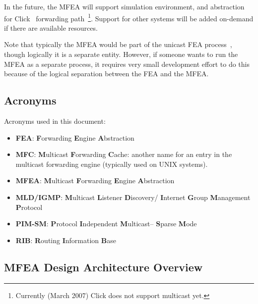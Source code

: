 \documentclass[11pt]{article}
\begin{document}
In the future, the MFEA will support simulation environment, and
abstraction for Click~\cite{CLICK-PROJECT} forwarding
path~\footnote{Currently (March 2007) Click does
not support multicast yet.}. Support for other systems will be added
on-demand if there are available resources.

Note that typically the MFEA would be part of the unicast FEA
process~\cite{xorp:fea}, though logically it is a separate entity.
However, if someone wants to run the MFEA as a separate process, it
requires very small development effort to do this because of the logical
separation between the FEA and the MFEA.

\subsection{Acronyms}

Acronyms used in this document:

\begin{itemize}

  \item {\bf FEA}: {\bf F}orwarding {\bf E}ngine {\bf A}bstraction

  \item {\bf MFC}: {\bf M}ulticast {\bf F}orwarding {\bf C}ache: another
  name for an entry in the multicast forwarding engine (typically used
  on UNIX systems).

  \item {\bf MFEA}: {\bf M}ulticast {\bf F}orwarding {\bf E}ngine
  {\bf A}bstraction

  \item {\bf MLD/IGMP}: {\bf M}ulticast {\bf L}istener {\bf D}iscovery/{\bf
  I}nternet {\bf G}roup {\bf M}anagement {\bf P}rotocol

  \item {\bf PIM-SM}: {\bf P}rotocol {\bf I}ndependent {\bf M}ulticast--{\bf
  S}parse {\bf M}ode

  \item {\bf RIB}: {\bf R}outing {\bf I}nformation {\bf B}ase

\end{itemize}


\subsection{MFEA Design Architecture Overview}
\end{document}
